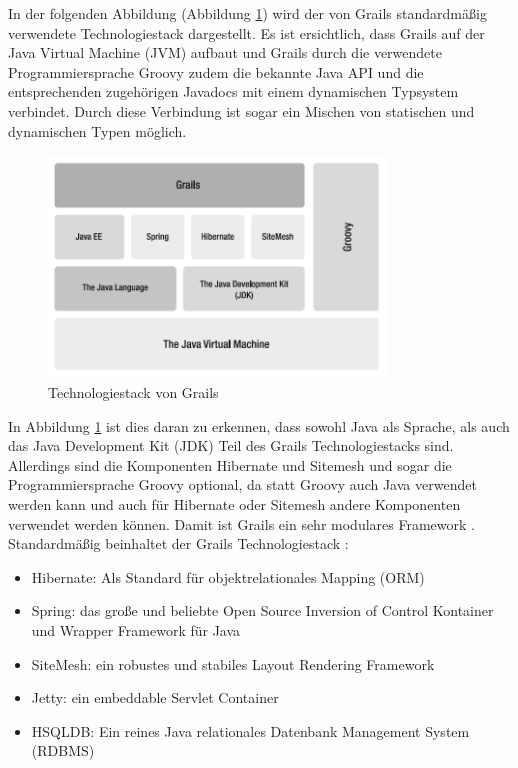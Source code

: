 In der folgenden Abbildung (Abbildung \ref{fig:tech-stack-grails}) wird der von Grails standardmäßig verwendete Technologiestack dargestellt. Es ist ersichtlich, dass Grails auf der Java Virtual Machine (JVM) aufbaut und Grails durch die verwendete Programmiersprache Groovy zudem die bekannte Java API und die entsprechenden zugehörigen Javadocs mit einem dynamischen Typsystem verbindet. Durch diese Verbindung ist sogar ein Mischen von statischen und dynamischen Typen möglich. \autocite[S.2-4]{DGG2002} 
\begin{figure}[h]
\centering
\includegraphics[width=0.80\textwidth]{img/Grails-Stack.png}
\caption {Technologiestack von Grails \autocite[S.3]{DGG2002}}
\label{fig:tech-stack-grails}
\end{figure} 
In Abbildung \ref{fig:tech-stack-grails} ist dies daran zu erkennen, dass sowohl Java als Sprache, als auch das Java Development Kit (JDK) Teil des Grails Technologiestacks sind. Allerdings sind die Komponenten Hibernate und Sitemesh und sogar die Programmiersprache Groovy optional, da statt Groovy auch Java verwendet werden kann und auch für Hibernate oder Sitemesh andere Komponenten verwendet werden können. Damit ist Grails ein sehr modulares Framework \autocite{GP2015}. Standardmäßig beinhaltet der Grails Technologiestack \autocite[S.2]{DGG2002}:
\begin{itemize}
\item Hibernate: Als Standard für objektrelationales Mapping (ORM)
\item Spring: das große und beliebte Open Source Inversion of Control Kontainer und Wrapper Framework für Java
\item SiteMesh: ein robustes und stabiles Layout Rendering Framework
\item Jetty: ein embeddable Servlet Container
\item HSQLDB: Ein reines Java relationales Datenbank Management System (RDBMS) 
\end{itemize}